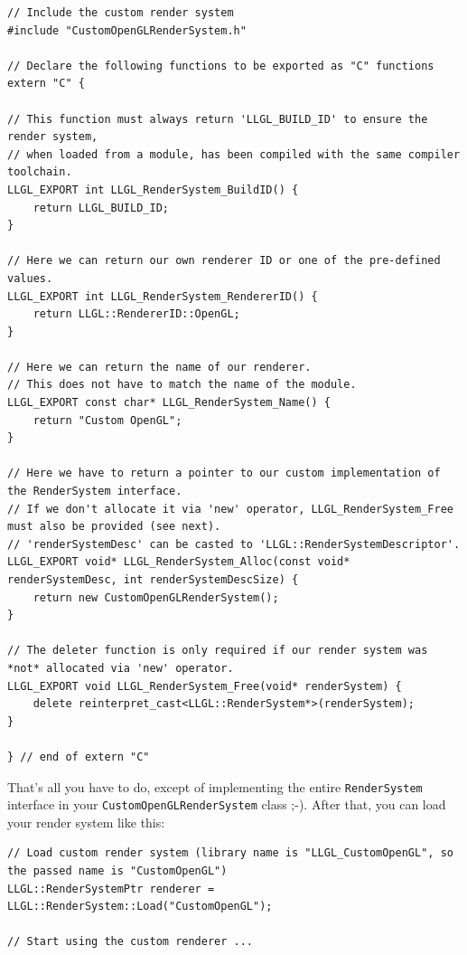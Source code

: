 \documentclass{article}
\begin{document}
\begin{lstlisting}
// Include the custom render system
#include "CustomOpenGLRenderSystem.h"

// Declare the following functions to be exported as "C" functions
extern "C" {

// This function must always return 'LLGL_BUILD_ID' to ensure the render system,
// when loaded from a module, has been compiled with the same compiler toolchain.
LLGL_EXPORT int LLGL_RenderSystem_BuildID() {
	return LLGL_BUILD_ID;
}

// Here we can return our own renderer ID or one of the pre-defined values.
LLGL_EXPORT int LLGL_RenderSystem_RendererID() {
	return LLGL::RendererID::OpenGL;
}

// Here we can return the name of our renderer.
// This does not have to match the name of the module.
LLGL_EXPORT const char* LLGL_RenderSystem_Name() {
	return "Custom OpenGL";
}

// Here we have to return a pointer to our custom implementation of the RenderSystem interface.
// If we don't allocate it via 'new' operator, LLGL_RenderSystem_Free must also be provided (see next).
// 'renderSystemDesc' can be casted to 'LLGL::RenderSystemDescriptor'.
LLGL_EXPORT void* LLGL_RenderSystem_Alloc(const void* renderSystemDesc, int renderSystemDescSize) {
	return new CustomOpenGLRenderSystem();
}

// The deleter function is only required if our render system was *not* allocated via 'new' operator.
LLGL_EXPORT void LLGL_RenderSystem_Free(void* renderSystem) {
    delete reinterpret_cast<LLGL::RenderSystem*>(renderSystem);
}

} // end of extern "C"
\end{lstlisting}
That's all you have to do, except of implementing the entire \texttt{RenderSystem} interface
in your \texttt{CustomOpenGLRenderSystem} class ;-).
After that, you can load your render system like this:
\begin{lstlisting}
// Load custom render system (library name is "LLGL_CustomOpenGL", so the passed name is "CustomOpenGL")
LLGL::RenderSystemPtr renderer = LLGL::RenderSystem::Load("CustomOpenGL");

// Start using the custom renderer ...
\end{lstlisting}





\end{document}
